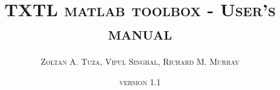\documentclass[english]{report}
\begin{document}
\title{\textsc{TXTL matlab toolbox - User's manual}}
\date{\textsc{version 1.1}}
\author{\textsc{Zoltan A. Tuza, Vipul Singhal, Richard M. Murray}}
\maketitle
\textsc{\tableofcontents}





	



\end{document}
